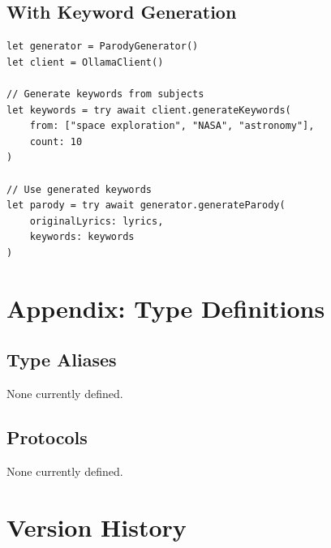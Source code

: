 \documentclass[11pt,a4paper]{article}
\begin{document}
\subsection{With Keyword Generation}

\begin{lstlisting}
let generator = ParodyGenerator()
let client = OllamaClient()

// Generate keywords from subjects
let keywords = try await client.generateKeywords(
    from: ["space exploration", "NASA", "astronomy"],
    count: 10
)

// Use generated keywords
let parody = try await generator.generateParody(
    originalLyrics: lyrics,
    keywords: keywords
)
\end{lstlisting}

\section{Appendix: Type Definitions}

\subsection{Type Aliases}

None currently defined.

\subsection{Protocols}

None currently defined.

\section{Version History}
\end{document}
